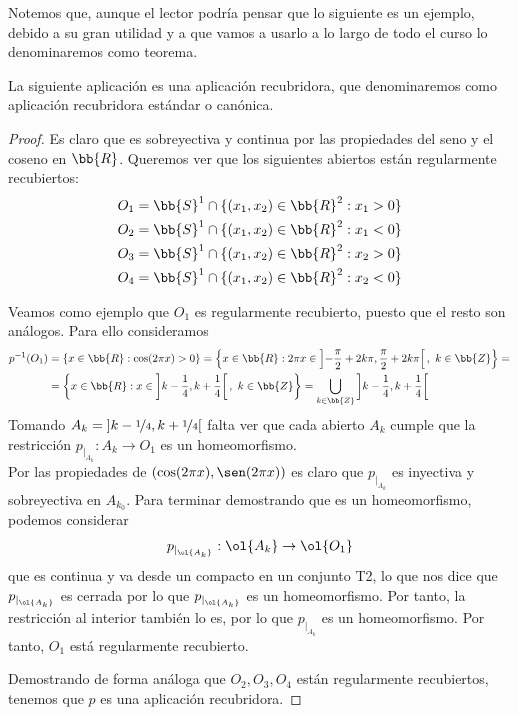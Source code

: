 Notemos que, aunque el lector podría pensar que lo siguiente es un ejemplo, debido a su gran utilidad y a que vamos a usarlo a lo largo de todo el curso lo denominaremos como teorema.
\begin{teo}\label{teo:aplicacion_recubridora_R_S1}
    La siguiente aplicación es una aplicación recubridora, que denominaremos como aplicación recubridora estándar o canónica.
    \begin{proof}
        Es claro que es sobreyectiva y continua por las propiedades del seno y el coseno en $\bb{R}$. Queremos ver que los siguientes abiertos están regularmente recubiertos:
        \begin{align*}
            O_{1} &= \bb{S}^1\cap \{(x_1,x_2)\in \bb{R}^2 : x_1>0\}\\
            O_{2} &= \bb{S}^1\cap \{(x_1,x_2)\in \bb{R}^2 : x_1<0\}\\
            O_{3} &= \bb{S}^1\cap \{(x_1,x_2)\in \bb{R}^2 : x_2>0\}\\
            O_{4} &= \bb{S}^1\cap \{(x_1,x_2)\in \bb{R}^2 : x_2<0\}
        \end{align*}

        Veamos como ejemplo que $O_1$ es regularmente recubierto, puesto que el resto son análogos. Para ello consideramos
        \begin{align*}
            p^{-1}(O_1) &= \{x\in \bb{R}: \cos(2\pi x) > 0\} = \left\{x\in \bb{R} : 2\pi x \in \left]-\frac{\pi}{2} + 2k\pi, \frac{\pi}{2} +2k\pi\right[,\ k\in \bb{Z}\right\} =\\
            &=\left\{x\in \bb{R} : x \in \left]k-\frac{1}{4}, k+\frac{1}{4}\right[,\ k\in \bb{Z}\right\} = \bigcup\limits_{k\in \bb{Z}}\left]k-\frac{1}{4}, k+\frac{1}{4}\right[
        \end{align*}
        Tomando $A_k = \left]k-\nicefrac{1}{4}, k+\nicefrac{1}{4}\right[$ falta ver que cada abierto $A_{k}$ cumple que la restricción $p_{|_{A_k}}:A_{k} \to O_{1}$ es un homeomorfismo.\\

        Por las propiedades de $(\cos(2\pi x), \sen(2\pi x))$ es claro que $p_{|_{A_k}}$ es inyectiva y sobreyectiva en $A_{k_0}$. Para terminar demostrando que es un homeomorfismo, podemos considerar 
        \begin{align*}
            p_{|_{\ol{A_k}}}:\ol{A_k}\to \ol{O_{1}}
        \end{align*}
        que es continua y va desde un compacto en un conjunto T2, lo que nos dice que $p_{|_{\ol{A_k}}}$ es cerrada por lo que $p_{|_{\ol{A_k}}}$ es un homeomorfismo. Por tanto, la restricción al interior
        también lo es, por lo que $p_{|_{A_k}}$ es un homeomorfismo. Por tanto, $O_1$ está regularmente recubierto.

        Demostrando de forma análoga que $O_2,O_3,O_4$ están regularmente recubiertos, tenemos que $p$ es una aplicación recubridora.
    \end{proof}
\end{teo}

